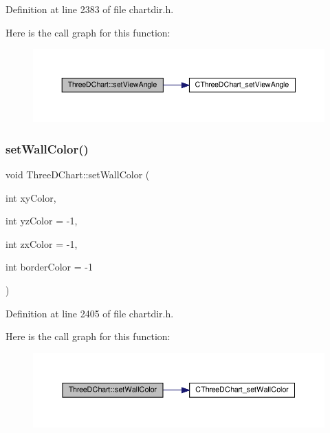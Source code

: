 Definition at line 2383 of file chartdir.\+h.

Here is the call graph for this function\+:
\nopagebreak
\begin{figure}[H]
\begin{center}
\leavevmode
\includegraphics[width=350pt]{class_three_d_chart_a04d610c665d0c550865e89ad5036a660_cgraph}
\end{center}
\end{figure}
\mbox{\label{class_three_d_chart_ab1b2d0127a2398c5c2a68d85e18a1f4a}} 
\subsubsection{\texorpdfstring{set\+Wall\+Color()}{setWallColor()}}
{\footnotesize\ttfamily void Three\+D\+Chart\+::set\+Wall\+Color (\begin{DoxyParamCaption}\item[{int}]{xy\+Color,  }\item[{int}]{yz\+Color = {\ttfamily -\/1},  }\item[{int}]{zx\+Color = {\ttfamily -\/1},  }\item[{int}]{border\+Color = {\ttfamily -\/1} }\end{DoxyParamCaption})\hspace{0.3cm}{\ttfamily [inline]}}



Definition at line 2405 of file chartdir.\+h.

Here is the call graph for this function\+:
\nopagebreak
\begin{figure}[H]
\begin{center}
\leavevmode
\includegraphics[width=350pt]{class_three_d_chart_ab1b2d0127a2398c5c2a68d85e18a1f4a_cgraph}
\end{center}
\end{figure}
\mbox{\label{class_three_d_chart_a5a057339c27b9faa0d46f07666f5b0e7}} 
